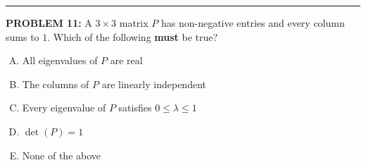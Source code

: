 \documentclass[12pt]{amsart}
\newcommand{\divider}{
  \vspace{-1em} %
  \noindent
  \raisebox{-0.15ex}{\textbullet}%
  \hspace{0.5em}%
  \rule[0.5ex]{0.95\textwidth}{1.0pt}%
  \hspace{0.5em}%
  \raisebox{-0.15ex}{\textbullet}%
  \vspace{0em} %
}
\begin{document}
\divider

{\bf PROBLEM 11:}
%
A $3 \times 3$ matrix $P$ has non-negative entries and every column 
sums to $1$.
%
Which of the following \textbf{must} be true?
\vspace{-0.1in}
\begin{enumerate}[(A)]
\item All eigenvalues of $P$ are real
\item The columns of $P$ are linearly independent
\item Every eigenvalue of $P$ satisfies $0 \leq \lambda \leq 1$
\item $\det(P) = 1$
\item None of the above
\end{enumerate}
\end{document}
